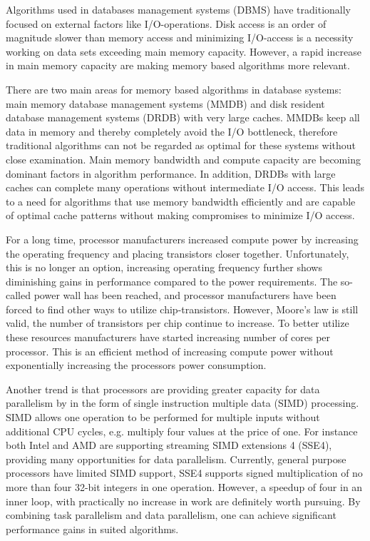 Algorithms used in databases management systems (DBMS) have
traditionally focused on external factors like I/O-operations. Disk
access is an order of magnitude slower than memory access and
minimizing I/O-access is a necessity working on data sets exceeding
main memory capacity. However, a rapid increase in main memory
capacity are making memory based algorithms more relevant.

There are two main areas for memory based algorithms in database
systems: main memory database management systems (MMDB) and disk
resident database management systems (DRDB) with very large caches.
MMDBs keep all data in memory and thereby completely avoid the I/O
bottleneck, therefore traditional algorithms can not be regarded as
optimal for these systems without close examination. Main memory
bandwidth and compute capacity are becoming dominant factors in
algorithm performance. In addition, DRDBs with large caches can
complete many operations without intermediate I/O access. This leads
to a need for algorithms that use memory bandwidth efficiently and are
capable of optimal cache patterns without making compromises to
minimize I/O access.

For a long time, processor manufacturers increased compute power by
increasing the operating frequency and placing transistors closer
together. Unfortunately, this is no longer an option, increasing
operating frequency further shows diminishing gains in performance
compared to the power requirements. The so-called power wall has been
reached, and processor manufacturers have been forced to find other
ways to utilize chip-transistors. However, Moore's law is still valid,
the number of transistors per chip continue to increase. To better
utilize these resources manufacturers have started increasing number
of cores per processor. This is an efficient method of increasing
compute power without exponentially increasing the processors power
consumption.

Another trend is that processors are providing greater capacity for
data parallelism by in the form of single instruction multiple data
(SIMD) processing. SIMD allows one operation to be performed for
multiple inputs without additional CPU cycles, e.g. multiply four
values at the price of one. For instance both Intel and AMD are
supporting streaming SIMD extensions 4 (SSE4), providing many
opportunities for data parallelism. Currently, general purpose
processors have limited SIMD support, SSE4 supports signed
multiplication of no more than four 32-bit integers in one operation.
However, a speedup of four in an inner loop, with practically no
increase in work are definitely worth pursuing. By combining task
parallelism and data parallelism, one can achieve significant
performance gains in suited algorithms. 

